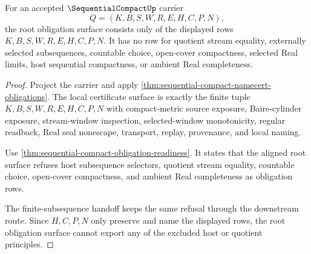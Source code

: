 \begin{theorem}
\label{thm:sequential-compact-root-obligation-nonescape}
For an accepted $\SequentialCompactUp$ carrier
$$
Q=(K,B,S,W,R,E,H,C,P,N),
$$
the root obligation surface consists only of the displayed rows $K,B,S,W,R,E,H,C,P,N$. It has no row for quotient stream equality, externally selected subsequences, countable choice, open-cover compactness, selected Real limits, host sequential compactness, or ambient Real completeness.
\end{theorem}
\begin{proof}
Project the carrier and apply \autoref{thm:sequential-compact-namecert-obligations}. The local certificate surface is exactly the finite tuple $K,B,S,W,R,E,H,C,P,N$ with compact-metric source exposure, Baire-cylinder exposure, stream-window inspection, selected-window monotonicity, regular readback, Real seal nonescape, transport, replay, provenance, and local naming.

Use \autoref{thm:sequential-compact-obligation-readiness}. It states that the aligned root surface refuses host subsequence selectors, quotient stream equality, countable choice, open-cover compactness, and ambient Real completeness as obligation rows.

The finite-subsequence handoff keeps the same refusal through the downstream route. Since $H,C,P,N$ only preserve and name the displayed rows, the root obligation surface cannot export any of the excluded host or quotient principles.
\end{proof}

